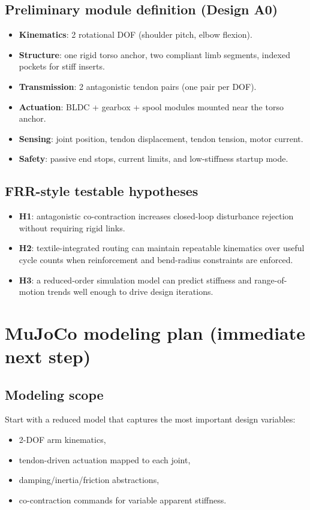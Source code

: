 \documentclass[11pt]{article}
\begin{document}
\subsection*{Preliminary module definition (Design A0)}
\begin{itemize}[leftmargin=*]
  \item \textbf{Kinematics}: 2 rotational DOF (shoulder pitch, elbow flexion).
  \item \textbf{Structure}: one rigid torso anchor, two compliant limb segments, indexed pockets for stiff inserts.
  \item \textbf{Transmission}: 2 antagonistic tendon pairs (one pair per DOF).
  \item \textbf{Actuation}: BLDC + gearbox + spool modules mounted near the torso anchor.
  \item \textbf{Sensing}: joint position, tendon displacement, tendon tension, motor current.
  \item \textbf{Safety}: passive end stops, current limits, and low-stiffness startup mode.
\end{itemize}

\subsection*{FRR-style testable hypotheses}
\begin{itemize}[leftmargin=*]
  \item \textbf{H1}: antagonistic co-contraction increases closed-loop disturbance rejection without requiring rigid links.
  \item \textbf{H2}: textile-integrated routing can maintain repeatable kinematics over useful cycle counts when reinforcement and bend-radius constraints are enforced.
  \item \textbf{H3}: a reduced-order simulation model can predict stiffness and range-of-motion trends well enough to drive design iterations.
\end{itemize}

\section*{MuJoCo modeling plan (immediate next step)}
\subsection*{Modeling scope}
Start with a reduced model that captures the most important design variables:
\begin{itemize}[leftmargin=*]
  \item 2-DOF arm kinematics,
  \item tendon-driven actuation mapped to each joint,
  \item damping/inertia/friction abstractions,
  \item co-contraction commands for variable apparent stiffness.
\end{itemize}
\end{document}
